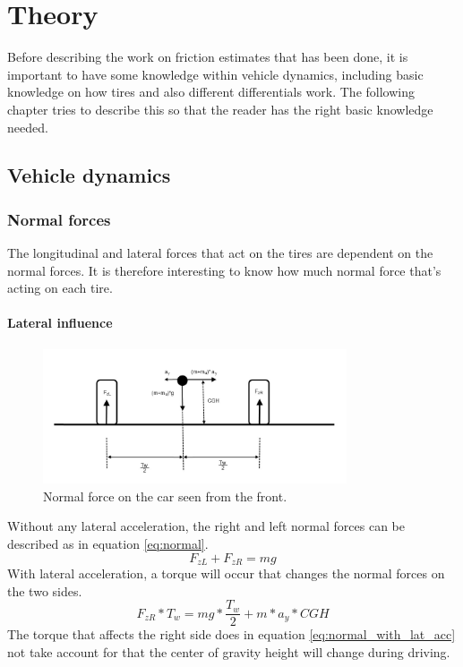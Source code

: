 \chapter{Theory}

Before describing the work on friction estimates that has been done, it is important to have some knowledge within vehicle dynamics, including basic knowledge on how tires and also different differentials work. The following chapter tries to describe this so that the reader has the right basic knowledge needed.

\cite{rajamani}

\section{Vehicle dynamics}

\subsection{Normal forces}

The longitudinal and lateral forces that act on the tires are dependent on the normal forces. It is therefore interesting to know how much normal force that's acting on each tire. 

\subsubsection{Lateral influence}

\begin{figure}[h]
	\centering
	\includegraphics[width=0.8\textwidth]{Pictures/normal_force_lateral}
	\caption{Normal force on the car seen from the front.}
	\label{normal_force_lateral}
\end{figure}
Without any lateral acceleration, the right and left normal forces can be described as in equation \ref{eq:normal}. 
\begin{equation} \label{eq:normal}
	F_{zL} + F_{zR} = mg
\end{equation}
With lateral acceleration, a torque will occur that changes the normal forces on the two sides. 
\begin{equation} \label{eq:normal_with_lat_acc}
	F_{zR}*T_{w} = mg*\frac{T_{w}}{2} + m*a_{y}*CGH
\end{equation}
The torque that affects the right side does in equation \ref{eq:normal_with_lat_acc} not take account for that the center of gravity height will change during driving.

